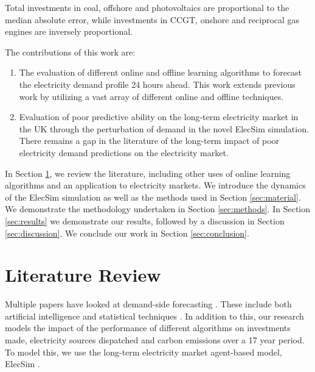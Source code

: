 \documentclass[final,3p,times,twocolumn,numbers]{elsarticle}
\begin{document}
Total investments in coal, offshore and photovoltaics are proportional to the median absolute error, while investments in CCGT, onshore and reciprocal gas engines are inversely proportional.




The contributions of this work are:

\begin{enumerate}
  \item The evaluation of different online and offline learning algorithms to forecast the electricity demand profile 24 hours ahead. This work extends previous work by utilizing a vast array of different online and offline techniques.
  \item Evaluation of poor predictive ability on the long-term electricity market in the UK through the perturbation of demand in the novel ElecSim simulation. There remains a gap in the literature of the long-term impact of poor electricity demand predictions on the electricity market.
\end{enumerate}


 


In Section \ref{sec:lit-review}, we review the literature, including other uses of online learning algorithms and an application to electricity markets. We introduce the dynamics of the ElecSim simulation as well as the methods used in Section \ref{sec:material}. We demonstrate the methodology undertaken in Section \ref{sec:methods}. In Section \ref{sec:results} we demonstrate our results, followed by a discussion in Section \ref{sec:discussion}. We conclude our work in Section \ref{sec:conclusion}.

\section{Literature Review}
\label{sec:lit-review}

Multiple papers have looked at demand-side forecasting \cite{Singh2012}. These include both artificial intelligence \cite{Kim2000, Tiong2008,Quilumba2014} and statistical techniques \cite{Huang2003,Nguyen2017}. In addition to this, our research models the impact of the performance of different algorithms on investments made, electricity sources dispatched and carbon emissions over a 17 year period. To model this, we use the long-term electricity market agent-based model, ElecSim \cite{Kell2020}.
\end{document}

